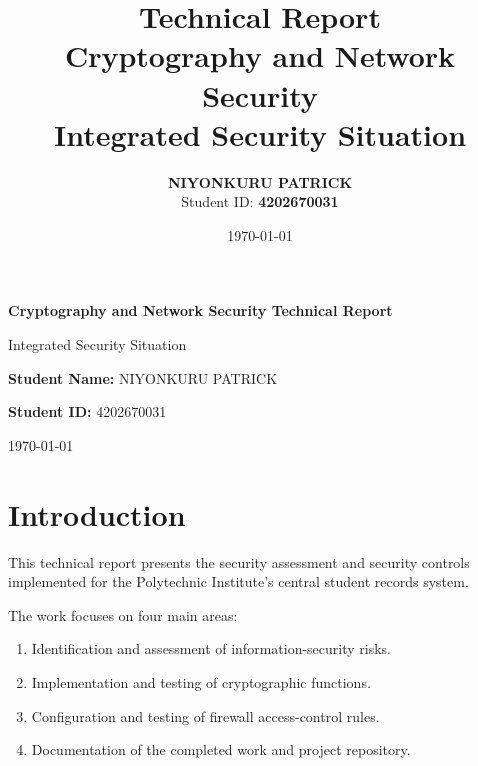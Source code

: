 \documentclass[12pt,a4paper]{article}
\title{
    \textbf{Technical Report}\\[0.3cm]
    \large Cryptography and Network Security\\
    \large Integrated Security Situation
}
\author{
    \textbf{NIYONKURU PATRICK}\\
    Student ID: \textbf{4202670031}
}
\date{\today}
\begin{document}
\begin{titlepage}

\centering

\vspace*{3cm}


\vspace{1.5cm}

{\Huge \textbf{Cryptography and Network Security Technical Report}\par}

\vspace{0.7cm}

{\Large Integrated Security Situation\par}

\vspace{2.5cm}

{\large
\textbf{Student Name:} NIYONKURU PATRICK 
\par}

\vspace{0.4cm}

{\large
\textbf{Student ID:} 4202670031
\par}

\vspace{0.4cm}

\vfill

{\large \today\par}

\end{titlepage}


\section{Introduction}

This technical report presents the security assessment and security controls implemented for the Polytechnic Institute's central student records system.

The work focuses on four main areas:

\begin{enumerate}
    \item Identification and assessment of information-security risks.
    \item Implementation and testing of cryptographic functions.
    \item Configuration and testing of firewall access-control rules.
    \item Documentation of the completed work and project repository.
\end{enumerate}
\end{document}
